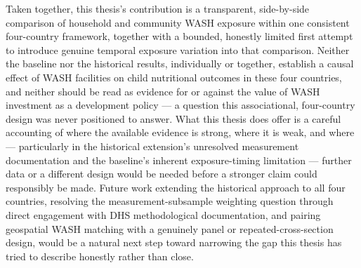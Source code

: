 Taken together, this thesis's contribution is a transparent, side-by-side comparison of household and community WASH exposure within one consistent four-country framework, together with a bounded, honestly limited first attempt to introduce genuine temporal exposure variation into that comparison. Neither the baseline nor the historical results, individually or together, establish a causal effect of WASH facilities on child nutritional outcomes in these four countries, and neither should be read as evidence for or against the value of WASH investment as a development policy --- a question this associational, four-country design was never positioned to answer. What this thesis does offer is a careful accounting of where the available evidence is strong, where it is weak, and where --- particularly in the historical extension's unresolved measurement documentation and the baseline's inherent exposure-timing limitation --- further data or a different design would be needed before a stronger claim could responsibly be made. Future work extending the historical approach to all four countries, resolving the measurement-subsample weighting question through direct engagement with DHS methodological documentation, and pairing geospatial WASH matching with a genuinely panel or repeated-cross-section design, would be a natural next step toward narrowing the gap this thesis has tried to describe honestly rather than close.
